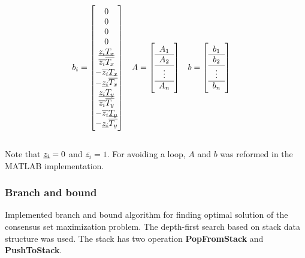 \documentclass[paper=a4, fontsize=11pt]{scrartcl} %
\numberwithin{equation}{section} %
\numberwithin{figure}{section} %
\numberwithin{table}{section} %
\newcommand{\funcname}[1]{\textbf{#1}}
\begin{document}
\begin{align*}
b_{i} &= 
\begin{bmatrix}
	0 \\ 0 \\ 0 \\ 0 \\ 
        \underbar{$z_{i}$}\underbar{$T_{x}$} \\
        \overline{z_{i}} \overline{T_{x}} \\
        -\overline{z_{i}} \underbar{$T_{x}$} \\
        -\underbar{$z_{i}$} \overline{T_{x}} \\
        \underbar{$z_{i}$}\underbar{$T_{y}$} \\
        \overline{z_{i}} \overline{T_{y}} \\
        -\overline{z_{i}} \underbar{$T_{y}$} \\
        -\underbar{$z_{i}$} \overline{T_{y}}
\end{bmatrix} &
A &=  
\left[ \begin{array}{c}
	A_{1} \\
	\hline 
	A_{2} \\
	\hline
	\vdots \\
	\hline
	A_{n} 
\end{array} \right] &
b &= 
\left[ \begin{array}{c}
	b_{1} \\
	\hline 
	b_{2} \\
	\hline
	\vdots \\
	\hline
	b_{n} 
\end{array} \right]
\end{align*} \\

Note that $\underbar{$z_{i}$} = 0$ and $\overline{z_{i}} = 1$. For avoiding a loop, $A$ and $b$ was reformed in the MATLAB implementation.


\subsubsection{Branch and bound}

Implemented branch and bound algorithm for finding optimal solution of the consensus set maximization problem. The depth-first search based on stack data structure was used. The stack has two operation \funcname{PopFromStack} and \funcname{PushToStack}. \\
\end{document}
